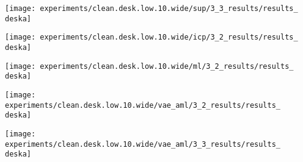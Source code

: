 {\begin{minipage}[t]{0.10\textwidth}
\end{minipage}
\begin{minipage}[t]{0.10\textwidth}
	\vspace{0px}\centering
	\texttt{[image: experiments/clean.desk.low.10.wide/sup/3\_3\_results/results\_\\deska]}
\end{minipage}
\begin{minipage}[t]{0.10\textwidth}
	\vspace{0px}\centering
	\texttt{[image: experiments/clean.desk.low.10.wide/icp/3\_2\_results/results\_\\deska]}
\end{minipage}
\begin{minipage}[t]{0.10\textwidth}
    \vspace{0px}\centering
    \texttt{[image: experiments/clean.desk.low.10.wide/ml/3\_2\_results/results\_\\deska]}
\end{minipage}
\begin{minipage}[t]{0.10\textwidth}
	\vspace{0px}\centering
	\texttt{[image: experiments/clean.desk.low.10.wide/vae\_aml/3\_2\_results/results\_\\deska]}
\end{minipage}
\begin{minipage}[t]{0.10\textwidth}
	\vspace{0px}\centering
	\texttt{[image: experiments/clean.desk.low.10.wide/vae\_aml/3\_3\_results/results\_\\deska]}
\end{minipage}
\begin{minipage}[t]{0.10\textwidth}

\end{minipage}}
